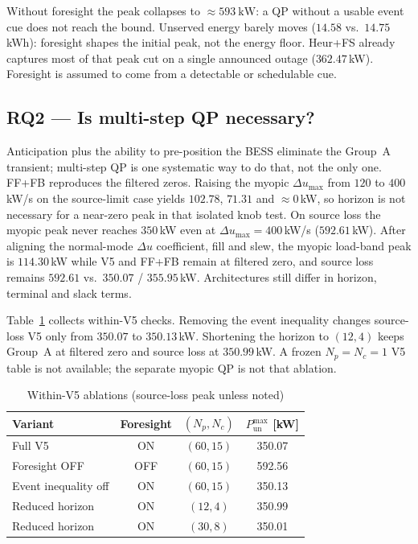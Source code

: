 \documentclass{ieeeaccess}
\begin{document}
Without foresight the peak collapses to $\approx\SI{593}{\kilo\watt}$: a QP without a usable event cue does not reach the bound. Unserved energy barely moves ($14.58$ vs.\ $14.75$\,kWh): foresight shapes the initial peak, not the energy floor. Heur+FS already captures most of that peak cut on a single announced outage ($362.47$\,kW). Foresight is assumed to come from a detectable or schedulable cue.

\subsection{RQ2 --- Is multi-step QP necessary?}
Anticipation plus the ability to pre-position the BESS eliminate the Group~A transient; multi-step QP is one systematic way to do that, not the only one. FF+FB reproduces the filtered zeros. Raising the myopic $\Delta u_{\max}$ from $120$ to $400$\,kW/s on the source-limit case yields $102.78$, $71.31$ and $\approx 0$\,kW, so horizon is not necessary for a near-zero peak in that isolated knob test. On source loss the myopic peak never reaches $350$\,kW even at $\Delta u_{\max}=400$\,kW/s ($592.61$\,kW). After aligning the normal-mode $\Delta u$ coefficient, fill and slew, the myopic load-band peak is $114.30$\,kW while V5 and FF+FB remain at filtered zero, and source loss remains $592.61$ vs.\ $350.07$ / $355.95$\,kW. Architectures still differ in horizon, terminal and slack terms.

Table~\ref{tab:ablation} collects within-V5 checks. Removing the event inequality changes source-loss V5 only from $350.07$ to $350.13$\,kW. Shortening the horizon to $(12,4)$ keeps Group~A at filtered zero and source loss at $350.99$\,kW. A frozen $N_p=N_c=1$ V5 table is not available; the separate myopic QP is not that ablation.

\begin{table}[!t]
\centering
\caption{Within-V5 ablations (source-loss peak unless noted)}
\label{tab:ablation}
{\footnotesize\setlength{\tabcolsep}{3pt}%
\begin{tabular}{@{}lccc@{}}
\toprule
Variant & Foresight & $(N_p,N_c)$ & $P_{\mathrm{un}}^{\max}$ [kW] \\
\midrule
Full V5 & ON & $(60,15)$ & 350.07 \\
Foresight OFF & OFF & $(60,15)$ & 592.56 \\
Event inequality off & ON & $(60,15)$ & 350.13 \\
Reduced horizon & ON & $(12,4)$ & 350.99 \\
Reduced horizon & ON & $(30,8)$ & 350.01 \\
\bottomrule
\end{tabular}}
\end{table}
\end{document}
